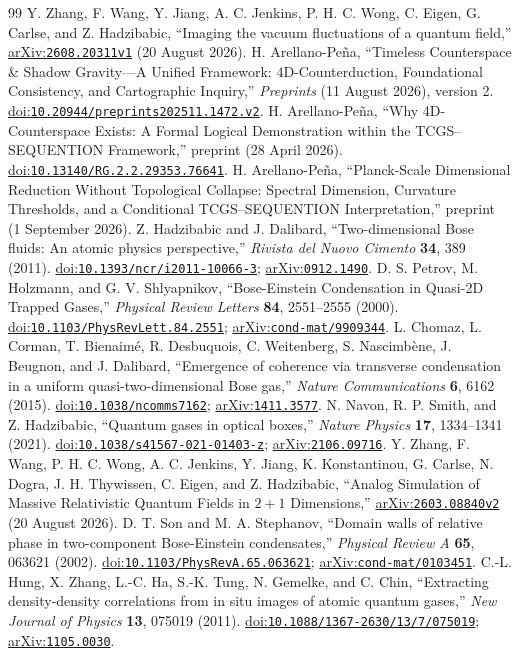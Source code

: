 \documentclass[11pt,a4paper]{article}
\theoremstyle{definition}
\theoremstyle{remark}
\newcommand{\doi}[1]{\href{https://doi.org/#1}{doi:\nolinkurl{#1}}}
\newcommand{\arxiv}[1]{\href{https://arxiv.org/abs/#1}{arXiv:\nolinkurl{#1}}}
\begin{document}
\begin{thebibliography}{99}
\small
\setlength{\itemsep}{0pt}
\setlength{\parskip}{0pt}
 Y. Zhang, F. Wang, Y. Jiang, A. C. Jenkins, P. H. C. Wong, C. Eigen, G. Carlse, and Z. Hadzibabic, ``Imaging the vacuum fluctuations of a quantum field,'' \arxiv{2608.20311v1} (20 August 2026).
 H. Arellano-Pe\~na, ``Timeless Counterspace \& Shadow Gravity---A Unified Framework: 4D-Counterduction, Foundational Consistency, and Cartographic Inquiry,'' \emph{Preprints} (11 August 2026), version 2. \doi{10.20944/preprints202511.1472.v2}.
 H. Arellano-Pe\~na, ``Why 4D-Counterspace Exists: A Formal Logical Demonstration within the TCGS--SEQUENTION Framework,'' preprint (28 April 2026). \doi{10.13140/RG.2.2.29353.76641}.
 H. Arellano-Pe\~na, ``Planck-Scale Dimensional Reduction Without Topological Collapse: Spectral Dimension, Curvature Thresholds, and a Conditional TCGS--SEQUENTION Interpretation,'' preprint (1 September 2026).
 Z. Hadzibabic and J. Dalibard, ``Two-dimensional Bose fluids: An atomic physics perspective,'' \emph{Rivista del Nuovo Cimento} \textbf{34}, 389 (2011). \doi{10.1393/ncr/i2011-10066-3}; \arxiv{0912.1490}.
 D. S. Petrov, M. Holzmann, and G. V. Shlyapnikov, ``Bose-Einstein Condensation in Quasi-2D Trapped Gases,'' \emph{Physical Review Letters} \textbf{84}, 2551--2555 (2000). \doi{10.1103/PhysRevLett.84.2551}; \arxiv{cond-mat/9909344}.
 L. Chomaz, L. Corman, T. Bienaim\'e, R. Desbuquois, C. Weitenberg, S. Nascimb\`ene, J. Beugnon, and J. Dalibard, ``Emergence of coherence via transverse condensation in a uniform quasi-two-dimensional Bose gas,'' \emph{Nature Communications} \textbf{6}, 6162 (2015). \doi{10.1038/ncomms7162}; \arxiv{1411.3577}.
 N. Navon, R. P. Smith, and Z. Hadzibabic, ``Quantum gases in optical boxes,'' \emph{Nature Physics} \textbf{17}, 1334--1341 (2021). \doi{10.1038/s41567-021-01403-z}; \arxiv{2106.09716}.
 Y. Zhang, F. Wang, P. H. C. Wong, A. C. Jenkins, Y. Jiang, K. Konstantinou, G. Carlse, N. Dogra, J. H. Thywissen, C. Eigen, and Z. Hadzibabic, ``Analog Simulation of Massive Relativistic Quantum Fields in $2+1$ Dimensions,'' \arxiv{2603.08840v2} (20 August 2026).
 D. T. Son and M. A. Stephanov, ``Domain walls of relative phase in two-component Bose-Einstein condensates,'' \emph{Physical Review A} \textbf{65}, 063621 (2002). \doi{10.1103/PhysRevA.65.063621}; \arxiv{cond-mat/0103451}.
 C.-L. Hung, X. Zhang, L.-C. Ha, S.-K. Tung, N. Gemelke, and C. Chin, ``Extracting density-density correlations from in situ images of atomic quantum gases,'' \emph{New Journal of Physics} \textbf{13}, 075019 (2011). \doi{10.1088/1367-2630/13/7/075019}; \arxiv{1105.0030}.

\end{thebibliography}
\end{document}
